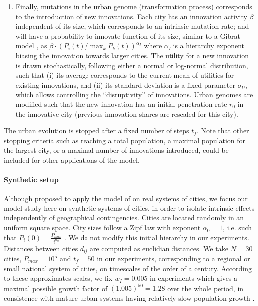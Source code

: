 \documentclass[letterpaper]{article}
\begin{document}
\begin{enumerate}
 \item Finally, mutations in the urban genome (transformation process) corresponds to the introduction of new innovations. Each city has an innovation activity $\beta$ independent of its size, which corresponds to an intrinsic mutation rate; and will have a probability to innovate function of its size, similar to a Gibrat model \citep{pumain2012theorie}, as $\beta \cdot \left(P_i (t) / \max_k P_k (t)\right)^{\alpha_I}$ where $\alpha_I$ is a hierarchy exponent biasing the innovation towards larger cities. The utility for a new innovation is drawn stochastically, following either a normal or log-normal distribution, such that (i) its average corresponds to the current mean of utilities for existing innovations, and (ii) its standard deviation is a fixed parameter $\sigma_U$, which allows controlling the ``disruptivity'' of innovations. Urban genomes are modified such that the new innovation has an initial penetration rate $r_0$ in the innovative city (previous innovation shares are rescaled for this city).
\end{enumerate}

The urban evolution is stopped after a fixed number of steps $t_f$. Note that other stopping criteria such as reaching a total population, a maximal population for the largest city, or a maximal number of innovations introduced, could be included for other applications of the model.

\paragraph{Synthetic setup}

Although \cite{raimbault:halshs-01880492} proposed to apply the model of \cite{favaro2011gibrat} on real systems of cities, we focus our model study here on synthetic systems of cities, in order to isolate intrinsic effects independently of geographical contingencies. Cities are located randomly in an uniform square space. City sizes follow a Zipf law with exponent $\alpha_0 = 1$, i.e. such that $P_i (0) = \frac{P_{max}}{i^{\alpha_0}}$ \citep{pumain2012theorie}. We do not modify this initial hierarchy in our experiments. Distances between cities $d_{ij}$ are computed as euclidian distances. We take $N=30$ cities, $P_{max} = 10^5$ and $t_f = 50$ in our experiments, corresponding to a regional or small national system of cities, on timescales of the order of a century. According to these approximates scales, we fix $w_I = 0.005$ in experiments which gives a maximal possible growth factor of $(1.005)^{50} = 1.28$ over the whole period, in consistence with mature urban systems having relatively slow population growth \citep{pumain1982dynamique}.
\end{document}
